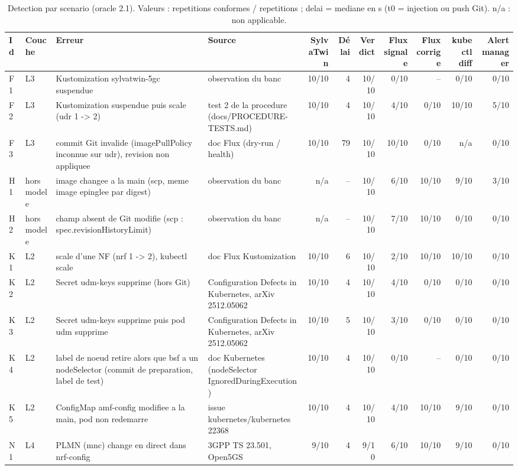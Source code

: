 \begin{table}[t]
\centering
\caption{Detection par scenario (oracle 2.1). Valeurs : repetitions conformes / repetitions ; delai = mediane en s (t0 = injection ou push Git). n/a : non applicable.}
\label{tab:resultats}
\small
\begin{tabular}{llp{3.6cm}p{2.4cm}rrrrrrr}
\hline
Id & Couche & Erreur & Source & SylvaTwin & D\'elai & Verdict & Flux signale & Flux corrige & kubectl diff & Alertmanager \\
\hline
F1 & L3 & Kustomization sylvatwin-5gc suspendue & observation du banc & 10/10 & 4 & 10/10 & 0/10 & -- & 0/10 & 0/10 \\
F2 & L3 & Kustomization suspendue puis scale (udr 1 -> 2) & test 2 de la procedure (docs/PROCEDURE-TESTS.md) & 10/10 & 4 & 10/10 & 4/10 & 0/10 & 10/10 & 5/10 \\
F3 & L3 & commit Git invalide (imagePullPolicy inconnue sur udr), revision non appliquee & doc Flux (dry-run / health) & 10/10 & 79 & 10/10 & 10/10 & 0/10 & n/a & 0/10 \\
H1 & hors modele & image changee a la main (scp, meme image epinglee par digest) & observation du banc & n/a & -- & 10/10 & 6/10 & 10/10 & 9/10 & 3/10 \\
H2 & hors modele & champ absent de Git modifie (scp : spec.revisionHistoryLimit) & observation du banc & n/a & -- & 10/10 & 7/10 & 10/10 & 0/10 & 0/10 \\
K1 & L2 & scale d'une NF (nrf 1 -> 2), kubectl scale & doc Flux Kustomization & 10/10 & 6 & 10/10 & 2/10 & 10/10 & 10/10 & 0/10 \\
K2 & L2 & Secret udm-keys supprime (hors Git) & Configuration Defects in Kubernetes, arXiv 2512.05062 & 10/10 & 4 & 10/10 & 4/10 & 0/10 & 0/10 & 0/10 \\
K3 & L2 & Secret udm-keys supprime puis pod udm supprime & Configuration Defects in Kubernetes, arXiv 2512.05062 & 10/10 & 5 & 10/10 & 3/10 & 0/10 & 0/10 & 0/10 \\
K4 & L2 & label de noeud retire alors que bsf a un nodeSelector (commit de preparation, label de test) & doc Kubernetes (nodeSelector IgnoredDuringExecution) & 10/10 & 4 & 10/10 & 0/10 & -- & 0/10 & 0/10 \\
K5 & L2 & ConfigMap amf-config modifiee a la main, pod non redemarre & issue kubernetes/kubernetes 22368 & 10/10 & 4 & 10/10 & 4/10 & 10/10 & 9/10 & 0/10 \\
N1 & L4 & PLMN (mnc) change en direct dans nrf-config & 3GPP TS 23.501, Open5GS & 9/10 & 4 & 9/10 & 6/10 & 10/10 & 9/10 & 0/10 \\

\end{tabular}
\end{table}
